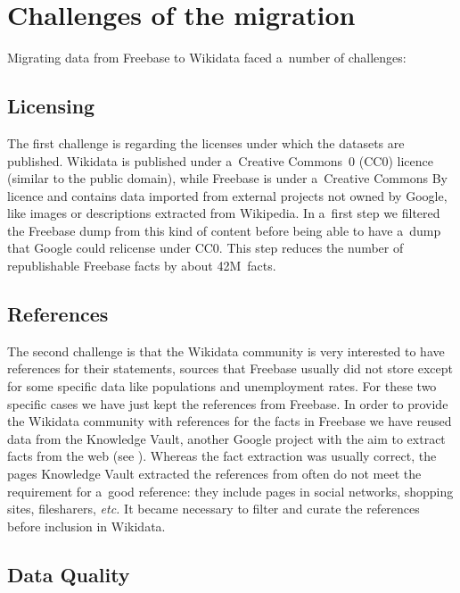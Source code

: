 \documentclass{sig-alternate}
\begin{document}
\section{Challenges of the migration}\label{sec:challenges-of-the-migration}

Migrating data from Freebase to Wikidata faced a~number of challenges:

\subsection{Licensing}
\label{sec-licensing}

The first challenge is regarding the licenses under which the datasets are published.
Wikidata is published under a~Creative Commons~0 (CC0) licence (similar to the public domain),
while Freebase is under a~Creative Commons By licence and contains data
imported from external projects not owned by Google,
like images or descriptions extracted from Wikipedia.
In a~first step we filtered the Freebase dump from this kind of content
before being able to have a~dump that Google could relicense under CC0.
This step reduces the number of republishable Freebase facts by about 42M~facts.

\subsection{References}

The second challenge is that the Wikidata community is very interested to have references
for their statements, sources that Freebase usually did not store except for
some specific data like populations and unemployment rates.
For these two specific cases we have just kept the references from Freebase.
In order to provide the Wikidata community with references for the facts in Freebase
we have reused data from the Knowledge Vault, another Google project with the aim
to extract facts from the web (see \cite{dong2014knowledge}).
Whereas the fact extraction was usually correct, the pages Knowledge Vault extracted
the references from often do not meet the requirement for a~good reference:
they include pages in social networks, shopping sites, filesharers, \emph{etc.}
It became necessary to filter and curate the references before inclusion in Wikidata.

\subsection{Data Quality}
\end{document}
